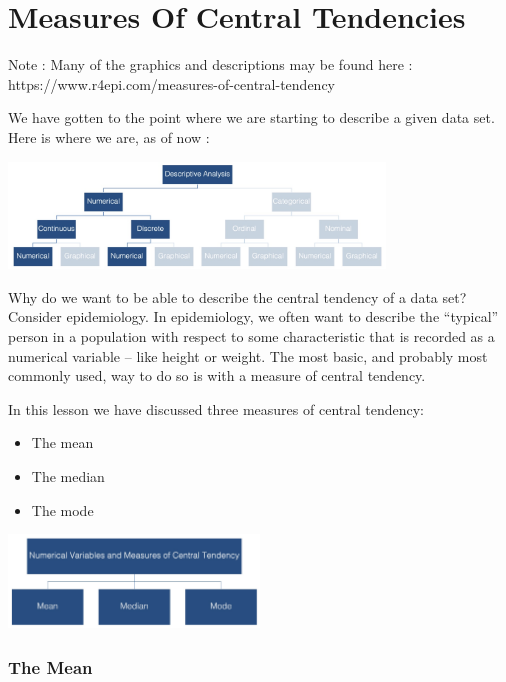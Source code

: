 \documentclass[
  letterpaper,
  DIV=11,
  numbers=noendperiod]{scrreprt}
\providecommand{\tightlist}{%
  \setlength{\itemsep}{0pt}\setlength{\parskip}{0pt}}\usepackage{longtable,booktabs,array}
\begin{document}

\chapter*{Measures Of Central
Tendencies}\label{measures-of-central-tendencies}


Note : Many of the graphics and descriptions may be found here :
https://www.r4epi.com/measures-of-central-tendency

We have gotten to the point where we are starting to describe a given
data set. Here is where we are, as of now :

\includegraphics[width=0.75\textwidth,height=\textheight]{./images/Daily-4-Pic-1.jpg}

Why do we want to be able to describe the central tendency of a data
set? Consider epidemiology. In epidemiology, we often want to describe
the ``typical'' person in a population with respect to some
characteristic that is recorded as a numerical variable -- like height
or weight. The most basic, and probably most commonly used, way to do so
is with a measure of central tendency.

In this lesson we have discussed three measures of central tendency:

\begin{itemize}
\tightlist
\item
  The mean
\item
  The median
\item
  The mode
\end{itemize}

\includegraphics[width=0.5\textwidth,height=\textheight]{./images/Daily-4-Pic-2.jpg}

\subsection*{The Mean}\label{the-mean}
\end{document}
